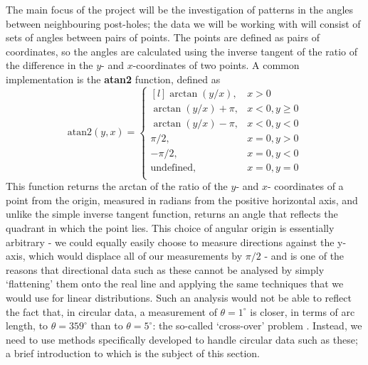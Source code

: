 \documentclass[../../ArchStats.tex]{subfiles}
\begin{document}
The main focus of the project will be the investigation of patterns in the angles between neighbouring post-holes; the data we will be working with will consist of sets of angles between pairs of points. The points are defined as pairs of coordinates, so the angles are calculated using the inverse tangent of the ratio of the difference in the $y$- and $x$-coordinates of two points. A common implementation is the \textbf{atan2} function, defined as
\begin{equation}
\label{eqn:atan2}
\text{atan2} (y, x) = \left\lbrace \begin{matrix*}[l]
\arctan(y/x), & x > 0 \\
\arctan(y/x) + \pi, & x < 0, y \geq 0 \\
\arctan(y/x) - \pi, & x < 0, y < 0 \\
\pi/2, & x = 0, y > 0 \\
-\pi/2, & x = 0, y < 0 \\
\text{undefined}, & x = 0, y = 0 \\
\end{matrix*} \right. 
\end{equation}
This function returns the arctan of the ratio of the $y$- and $x$- coordinates of a point from the origin, measured in radians from the positive horizontal axis, and unlike the simple inverse tangent function, returns an angle that reflects the quadrant in which the point lies. This choice of angular origin is essentially arbitrary - we could equally easily choose to measure directions against the y-axis, which would displace all of our measurements by $\pi/2$ - and is one of the reasons that directional  data such as these cannot be analysed by simply `flattening' them onto the real line and applying the same techniques that we would use for linear distributions. Such an analysis would not be able to reflect the fact that, in circular data, a measurement of $\theta = 1^\circ$ is closer, in terms of arc length, to $\theta = 359^\circ$ than to $\theta = 5^\circ$: the so-called `cross-over' problem \cite{Fisher1993}. Instead, we need to use methods specifically developed to handle circular data such as these; a brief introduction to which is the subject of this section. 

\end{document}
